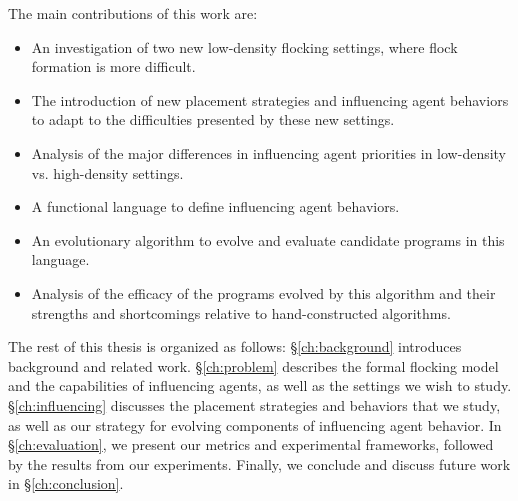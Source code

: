 The main contributions of this work are:
\begin{itemize}
    \item An investigation of two new low-density flocking settings, where
    flock formation is more difficult.
    \item The introduction of new placement strategies and influencing agent
    behaviors to adapt to the difficulties presented by these new settings.
    \item Analysis of the major differences in influencing agent priorities in
    low-density vs. high-density settings.
    \item A functional language to define influencing agent behaviors.
    \item An evolutionary algorithm to evolve and evaluate candidate programs
    in this language.
    \item Analysis of the efficacy of the programs evolved by this algorithm
    and their strengths and shortcomings relative to hand-constructed
    algorithms.
\end{itemize}

The rest of this thesis is organized as follows: \S\ref{ch:background}
introduces background and related work.
\S\ref{ch:problem} describes the formal flocking model and the capabilities of
influencing agents, as well as the settings we wish to study.
\S\ref{ch:influencing} discusses the placement strategies and behaviors that we
study, as well as our strategy for evolving components of influencing agent
behavior.
In \S\ref{ch:evaluation}, we present our metrics and experimental frameworks,
followed by the results from our experiments.
Finally, we conclude and discuss future work in \S\ref{ch:conclusion}.

